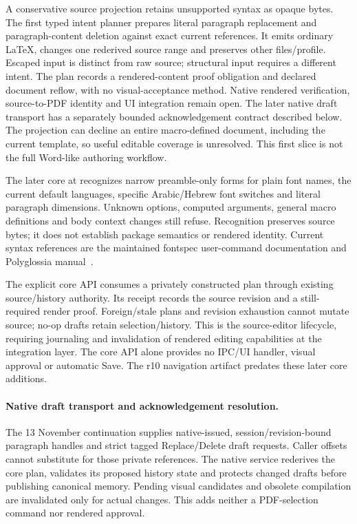A conservative source projection retains unsupported syntax as opaque bytes.
The first typed intent planner prepares literal paragraph replacement and
paragraph-content deletion against exact current references. It emits ordinary
\LaTeX, changes one rederived source range and preserves other files/profile.
Escaped input is distinct from raw source; structural input requires a different
intent. The plan records a rendered-content proof obligation and declared
document reflow, with no visual-acceptance method. Native rendered verification,
source-to-PDF identity and UI integration remain open. The later native draft
transport has a separately bounded acknowledgement contract described below.
The projection can decline an entire macro-defined document, including the
current template, so useful editable coverage is unresolved. This first slice
is not the full Word-like authoring workflow.

The later core at  recognizes narrow preamble-only forms for
plain font names, the current default languages, specific Arabic/Hebrew font
switches and literal paragraph dimensions. Unknown options, computed arguments,
general macro definitions and body context changes still refuse. Recognition
preserves source bytes; it does not establish package semantics or rendered
identity. Current syntax references are the maintained fontspec user-command
documentation and Polyglossia manual~\cite{fontspeccommands,polyglossiamanual}.

The explicit  core API consumes a privately
constructed plan through existing source/history authority. Its receipt records
the source revision and a still-required render proof. Foreign/stale plans and
revision exhaustion cannot mutate source; no-op drafts retain selection/history.
This is the source-editor lifecycle, requiring journaling and invalidation of
rendered editing capabilities at the integration layer. The core API alone
provides no IPC/UI handler, visual approval or automatic Save. The r10
navigation artifact predates these later core additions.

\paragraph{Native draft transport and acknowledgement resolution.}
The 13 November continuation supplies native-issued, session/revision-bound
paragraph handles and strict tagged Replace/Delete draft requests. Caller
offsets cannot substitute for those private references. The native service
rederives the core plan, validates its proposed history state and protects
changed drafts before publishing canonical memory. Pending visual candidates
and obsolete compilation are invalidated only for actual changes. This adds
neither a PDF-selection command nor rendered approval.

